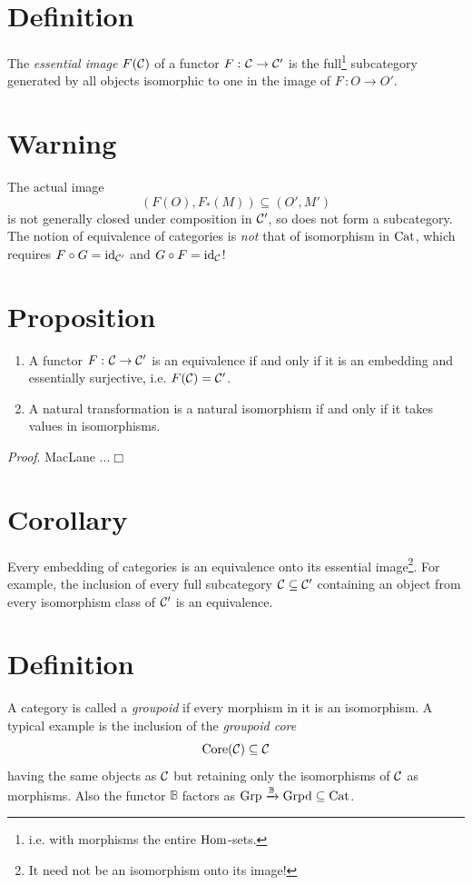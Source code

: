     \section{Definition}
        The \emph{essential image} $F(\mathcal{C})$ of a functor $F \,\colon \mathcal{C} \to \mathcal{C}'$ is the full\footnote{i.e. with morphisms the entire $\operatorname{Hom}$-sets.} subcategory generated by all objects isomorphic to one in the image of $F \,\colon O \to O'$.
    \section{Warning}
        The actual image
        \begin{equation*}
            (F(O), F_*(M)) \subseteq (O', M')
        \end{equation*}
        is not generally closed under composition in $\mathcal{C}'$, so does not form a subcategory.
        The notion of equivalence of categories is \emph{not} that of isomorphism in $\operatorname{Cat}$, which requires $F \circ G = \operatorname{id}_{\mathcal{C}'}$ and $G \circ F = \operatorname{id}_{\mathcal{C}}$! 
    \section{Proposition}\label{chI-14}
        \begin{enumerate}[label=\roman*)]
            \item 
                A functor $F \,\colon \mathcal{C} \to \mathcal{C}'$ is an equivalence if and only if it is an embedding and essentially surjective, i.e. $F(\mathcal{C}) = \mathcal{C}'$.
            \item
                A natural transformation is a natural isomorphism if and only if it takes values in isomorphisms.\label{chI-14-ii}
        \end{enumerate}
        \smallskip 
        
        \emph{Proof}. MacLane ...\hfill\(\Box\)
    \section{Corollary}
        Every embedding of categories is an equivalence onto its essential image\footnote{It need not be an isomorphism onto its image!}.
        For example, the inclusion of every full subcategory $\mathcal{C} \subseteq \mathcal{C}'$ containing an object from every isomorphism class of $\mathcal{C}'$ is an equivalence.
    \section{Definition}
        A category is called a \emph{groupoid} if every morphism in it is an isomorphism.
        A typical example is the inclusion of the \emph{groupoid core}
        \begin{equation*}
            \operatorname{Core}(\mathcal{C}) \subseteq \mathcal{C}
        \end{equation*}
        having the same objects as $\mathcal{C}$ but retaining only the isomorphisms of $\mathcal{C}$ as morphisms. Also the functor $\mathbb{B}$ factors as $\operatorname{Grp} \xrightarrow{\mathbb{B}} \operatorname{Grpd} \subseteq \operatorname{Cat}$.
        \medskip

